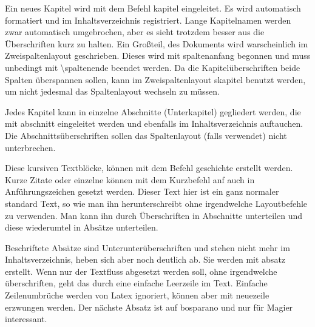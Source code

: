 \documentclass{Ilaris}
\begin{document}
\anfang
{}
\inhaltsverzeichnis
\neueseite
\hauptteil
{}
\platz
{}
\lizenz
{}
Ein neues Kapitel wird mit dem Befehl \gls{kapitel} eingeleitet. Es wird automatisch formatiert und im Inhaltsverzeichnis registriert. Lange Kapitelnamen werden zwar automatisch umgebrochen, aber es sieht trotzdem besser aus die Überschriften kurz zu halten. Ein Großteil, des Dokuments wird warscheinlich im Zweispaltenlayout geschrieben. Dieses wird mit \gls{spaltenanfang} begonnen und muss unbedingt mit \textbackslash spaltenende beendet werden. Da die Kapitelüberschriften beide Spalten überspannen sollen, kann im Zweispaltenlayout \gls{skapitel} benutzt werden, um nicht jedesmal das Spaltenlayout wechseln zu müssen.

\spaltenanfang
{}
Jedes Kapitel kann in einzelne Abschnitte (Unterkapitel) gegliedert werden, die mit \gls{abschnitt} eingeleitet werden und ebenfalls im Inhaltsverzeichnis auftauchen. Die Abschnittsüberschriften sollen das Spaltenlayout (falls verwendet) nicht unterbrechen.

Diese kursiven Textblöcke, können mit dem Befehl \gls{geschichte} erstellt werden. Kurze Zitate oder einzelne  können mit dem Kurzbefehl \gls{anf} auch in Anführungszeichen gesetzt werden. Dieser Text hier ist ein ganz normaler standard Text, so wie man ihn herunterschreibt ohne irgendwelche Layoutbefehle zu verwenden. Man kann ihn durch Überschriften in Abschnitte unterteilen und diese wiederumtel in Absätze unterteilen.

Beschriftete Absätze sind Unterunterüberschriften und stehen nicht mehr im Inhaltsverzeichnis, heben sich aber noch deutlich ab. Sie werden mit \gls{absatz} erstellt. Wenn nur der Textfluss abgesetzt werden soll, ohne irgendwelche überschriften, geht das durch eine einfache Leerzeile im Text. Einfache Zeilenumbrüche werden von Latex ignoriert, können aber mit \gls{neuezeile} erzwungen werden. Der nächste Absatz ist auf bosparano und nur für Magier interessant.
\end{document}
